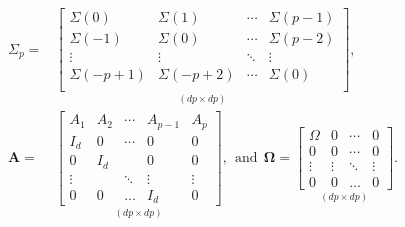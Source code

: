 \documentclass[nojss]{jss}
\begin{document}
\begin{align}\label{eq:gausmatrices}
\begin{aligned}
\Sigma_p = &
\underset{(dp\times dp)}{\begin{bmatrix}
\Sigma(0) &  \Sigma(1) & \cdots & \Sigma(p-1) \\
\Sigma(-1) &  \Sigma(0) & \cdots & \Sigma(p-2) \\
\vdots        &   \vdots   & \ddots & \vdots  \\
\Sigma(-p+1) &  \Sigma(-p+2) & \cdots & \Sigma(0) \\
\end{bmatrix}},
\\
\boldsymbol{A} = &
\underset{(dp\times dp)}{\begin{bmatrix}
A_1 & A_2 & \cdots & A_{p-1} & A_p \\
I_d  & 0     & \cdots & 0            & 0 \\
0     & I_d  &             & 0            & 0 \\
\vdots &   & \ddots & \vdots    & \vdots \\
0     & 0     & \hdots & I_d         & 0
\end{bmatrix}},
\ \ \text{and} \ \
\boldsymbol{\Omega} =
\underset{(dp\times dp)}{\begin{bmatrix}
\Omega & 0 & \cdots & 0  \\
0            & 0 & \cdots & 0   \\
\vdots    &  \vdots & \ddots & \vdots \\
0            & 0 & \hdots &  0
\end{bmatrix}}.
\end{aligned}
\end{align}
\end{document}
